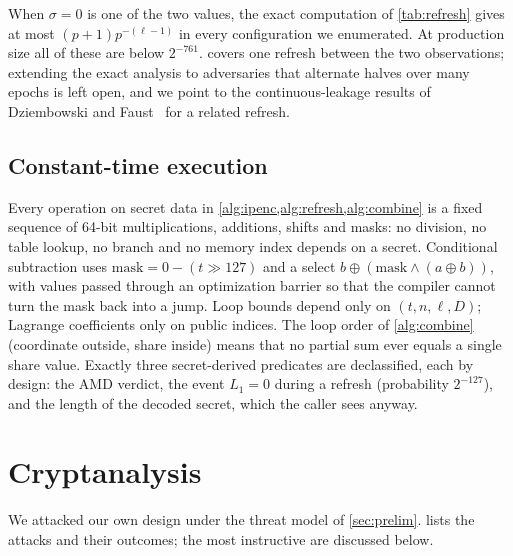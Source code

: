 \documentclass[10.5pt,a4paper]{article}
\theoremstyle{plain}
\theoremstyle{definition}
\begin{document}
When $\sigma=0$ is one of the two values, the exact computation of \cref{tab:refresh} gives at most $(p+1)p^{-(\ell-1)}$ in every configuration we enumerated. At production size all of these are below $2^{-761}$.  covers one refresh between the two observations; extending the exact analysis to adversaries that alternate halves over many epochs is left open, and we point to the continuous-leakage results of Dziembowski and Faust~\cite{dziembowski11} for a related refresh.

\subsection{Constant-time execution}\label{sec:ct}

Every operation on secret data in \cref{alg:ipenc,alg:refresh,alg:combine} is a fixed sequence of 64-bit multiplications, additions, shifts and masks: no division, no table lookup, no branch and no memory index depends on a secret. Conditional subtraction uses $\mathrm{mask}=0-(t\gg127)$ and a select $b\oplus(\mathrm{mask}\wedge(a\oplus b))$, with values passed through an optimization barrier so that the compiler cannot turn the mask back into a jump. Loop bounds depend only on $(t,n,\ell,D)$; Lagrange coefficients only on public indices. The loop order of \cref{alg:combine} (coordinate outside, share inside) means that no partial sum ever equals a single share value. Exactly three secret-derived predicates are declassified, each by design: the AMD verdict, the event $L_1=0$ during a refresh (probability $2^{-127}$), and the length of the decoded secret, which the caller sees anyway.

\section{Cryptanalysis}\label{sec:cryptanalysis}

We attacked our own design under the threat model of \cref{sec:prelim}.  lists the attacks and their outcomes; the most instructive are discussed below.
\end{document}
